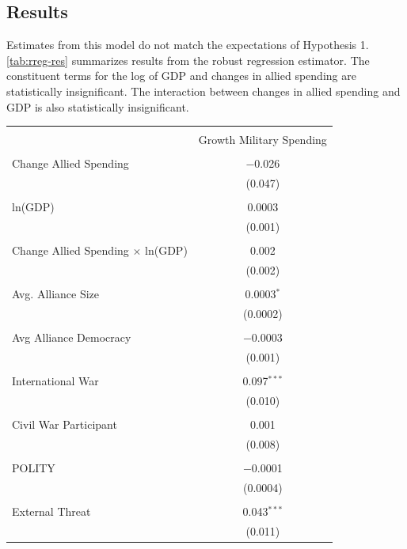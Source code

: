 \documentclass[12pt]{article}
\begin{document}
\subsection{Results}


Estimates from this model do not match the expectations of Hypothesis 1. 
\autoref{tab:rreg-res} summarizes results from the robust regression estimator. 
The constituent terms for the log of GDP and changes in allied spending are statistically insignificant. 
The interaction between changes in allied spending and GDP is also statistically insignificant. 


\begin{table}[!htbp] \centering 
\begin{tabular}{@{\extracolsep{5pt}}lc} 
\\[-1.8ex]\hline 
\hline \\[-1.8ex] 
  & Growth Military Spending \\ 
\hline \\[-1.8ex] 
 Change Allied Spending & $-$0.026 \\ 
  & (0.047) \\ 
  & \\ 
 ln(GDP) & 0.0003 \\ 
  & (0.001) \\ 
  & \\ 
 Change Allied Spending $\times$ ln(GDP) & 0.002 \\ 
  & (0.002) \\ 
  & \\ 
 Avg. Alliance Size & 0.0003$^{*}$ \\ 
  & (0.0002) \\ 
  & \\ 
 Avg Alliance Democracy & $-$0.0003 \\ 
  & (0.001) \\ 
  & \\ 
 International War & 0.097$^{***}$ \\ 
  & (0.010) \\ 
  & \\ 
 Civil War Participant & 0.001 \\ 
  & (0.008) \\ 
  & \\ 
 POLITY & $-$0.0001 \\ 
  & (0.0004) \\ 
  & \\ 
 External Threat & 0.043$^{***}$ \\ 
  & (0.011) \\ 

\end{tabular}
\end{table}
\end{document}
